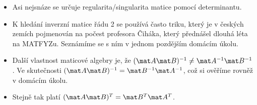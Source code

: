 \begin{itemize}
    \item Asi nejsnáze se určuje regularita/singularita matice pomocí determinantu.
    \item K hledání inverzní matice řádu 2 se používá často triku, který je v českých zemích pojmenován  na počest profesora Čiháka, který přednášel dlouhá léta na MATFYZu. Seznámíme se s ním v jednom pozdějším domácím úkolu.
    \item Další vlastnost maticové algebry je, že $(\mat A \mat B)^{-1} \neq \mat A^{-1} \mat B^{-1}$. Ve skutečnosti $(\mat A \mat B)^{-1} = \mat B^{-1} \mat A^{-1}$, což si ověříme rovněž v domácím úkolu.
    \item Stejně tak platí $(\mat A \mat B)^T = \mat B^T \mat A^T$.
\end{itemize}